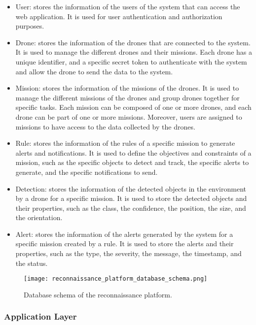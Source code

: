 \begin{itemize}
	\item User: stores the information of the users of the system that can access the web application. It is used for user authentication and authorization purposes.

	\item Drone: stores the information of the drones that are connected to the system. It is used to manage the different drones and their missions. Each drone has a unique identifier, and a specific secret token to authenticate with the system and allow the drone to send the data to the system.

	\item Mission: stores the information of the missions of the drones. It is used to manage the different missions of the drones and group drones together for specific tasks. Each mission can be composed of one or more drones, and each drone can be part of one or more missions. Moreover, users are assigned to missions to have access to the data collected by the drones.

	\item Rule: stores the information of the rules of a specific mission to generate alerts and notifications. It is used to define the objectives and constraints of a mission, such as the specific objects to detect and track, the specific alerts to generate, and the specific notifications to send.

	\item Detection: stores the information of the detected objects in the environment by a drone for a specific mission. It is used to store the detected objects and their properties, such as the class, the confidence, the position, the size, and the orientation.

	\item Alert: stores the information of the alerts generated by the system for a specific mission created by a rule. It is used to store the alerts and their properties, such as the type, the severity, the message, the timestamp, and the status.
\end{itemize}

\begin{figure}
	\texttt{[image: reconnaissance\_platform\_database\_schema.png]}
	\caption{Database schema of the reconnaissance platform.}\label{fig:database_schema}
\end{figure}

\subsubsection{Application Layer}\label{subsubsec:implementation_application_layer}

